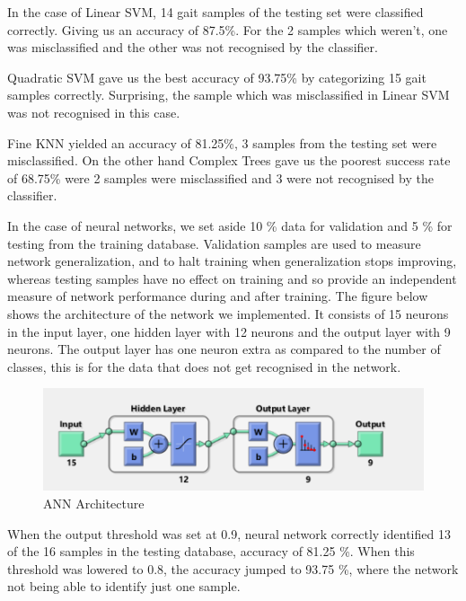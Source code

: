 \newpage

\noindent In the case of Linear SVM, 14 gait samples of the testing set were classified correctly. Giving us an accuracy of 87.5\%. For the 2 samples which weren’t, one was misclassified and the other was not recognised by the classifier.

\noindent Quadratic SVM gave us the best accuracy of 93.75\% by categorizing 15 gait samples correctly. Surprising, the sample which was misclassified in Linear SVM was not recognised in this case.

\noindent Fine KNN yielded an accuracy of 81.25\%, 3 samples from the testing set were misclassified. On the other hand Complex Trees gave us the poorest success rate of 68.75\% were 2 samples were misclassified and 3 were not recognised by the classifier. 

\noindent In the case of neural networks, we set aside 10 \% data for validation and 5 \% for testing from the training database. Validation samples are used to measure network generalization, and to halt training when generalization stops improving, whereas testing samples have no effect on training and so provide an independent measure of network performance during and after training.
The figure below shows the architecture of the network we implemented. It consists of 15 neurons in the input layer, one hidden layer with 12 neurons and the output layer with 9 neurons. The output layer has one neuron extra as compared to the number of classes, this is for the data that does not get recognised in the network.

\begin{figure}[h]
\centering
\includegraphics[scale=0.9]{anna.png}
\caption{ANN Architecture}
\end{figure}

\noindent When the output threshold was set at 0.9, neural network correctly identified 13 of the 16 samples in the testing database, accuracy of 81.25 \%. When this threshold was lowered to 0.8, the accuracy jumped to 93.75 \%, where the network not being able to identify just one sample.